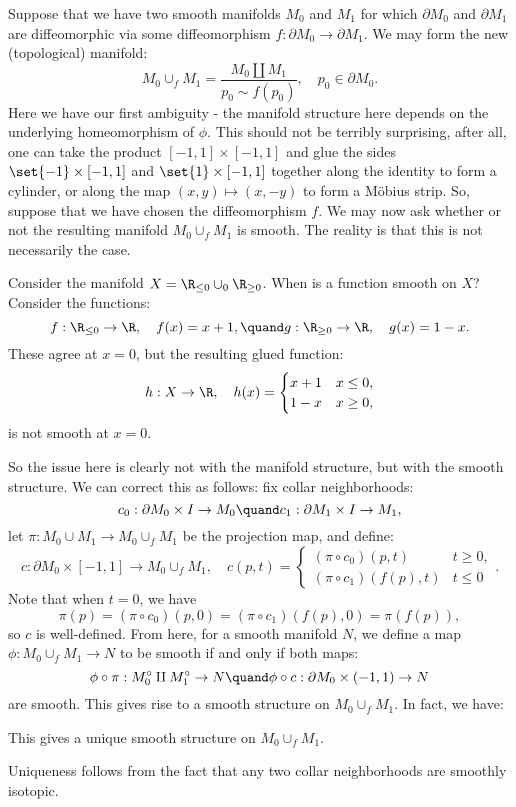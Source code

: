 Suppose that we have two smooth manifolds $M_0$ and $M_1$ for which $\partial{M_0}$ and $\partial{M_1}$ are diffeomorphic via some diffeomorphism $f:\partial{M_0}\to\partial{M_1}$. We may form the new (topological) manifold:
\[
    M_0\cup_f M_1 = \dfrac{M_0\amalg M_1}{p_0\sim f(p_0)},\quad p_0\in\partial{M_0}.
\]
Here we have our first ambiguity - the manifold structure here depends on the underlying homeomorphism of $\phi$. This should not be terribly surprising, after all, one can take the product $[-1,1]\times [-1,1]$ and glue the sides $\set{-1}\times[-1,1]$ and $\set{1}\times[-1,1]$ together along the identity to form a cylinder, or along the map $(x,y)\mapsto(x,-y)$ to form a M\"obius strip. So, suppose that we have chosen the diffeomorphism $f$. We may now ask whether or not the resulting manifold $M_0\cup_f M_1$ is smooth. The reality is that this is not necessarily the case. 

\begin{exm}
    Consider the manifold $X = \R_{\leq 0}\cup_0\R_{\geq 0}$. When is a function smooth on $X$? Consider the functions:
    \[
        f:\R_{\leq0}\to\R,\quad f(x) = x+1,\quand g:\R_{\geq0}\to\R,\quad g(x) = 1-x.
    \]
    These agree at $x=0$, but the resulting glued function:
    \[
        h:X\to\R,\quad h(x) = \begin{cases}
            x+1 & x\leq 0,\\
            1-x & x\geq 0,
        \end{cases}
    \]
    is not smooth at $x=0$.
\end{exm}

So the issue here is clearly not with the manifold structure, but with the smooth structure. We can correct this as follows: fix collar neighborhoods:
\[
    c_0:\partial{M_0}\times{I}\to M_0 \quand c_1:\partial{M_1}\times{I}\to M_1,
\]
let $\pi:M_0\cup M_1\to M_0\cup_fM_1$ be the projection map, and define:
\[
    c:\partial{M_0}\times[-1,1]\to M_0\cup_f M_1,\quad c(p,t) = \begin{cases}
        (\pi\circ c_0)(p,t) & t \geq 0,\\
        (\pi\circ c_1)(f(p),t) & t\leq 0
    \end{cases}.
\]
Note that when $t=0$, we have 
\[
    \pi(p) = (\pi\circ c_0)(p,0) = (\pi\circ c_1)(f(p),0) = \pi(f(p)),
\]
so $c$ is well-defined. From here, for a smooth manifold $N$, we define a map $\phi:M_0\cup_f M_1\to N$ to be smooth if and only if both maps:
\[
    \phi\circ\pi:M_0^{\circ}\amalg M_1^{\circ}\to N \quand \phi\circ c:\partial{M_0}\times(-1,1)\to N
\]
are smooth. This gives rise to a smooth structure on $M_0\cup_f M_1$. In fact, we have:

\begin{prop}
    This gives a unique smooth structure on $M_0\cup_f M_1$.
\end{prop}

Uniqueness follows from the fact that any two collar neighborhoods are smoothly isotopic.